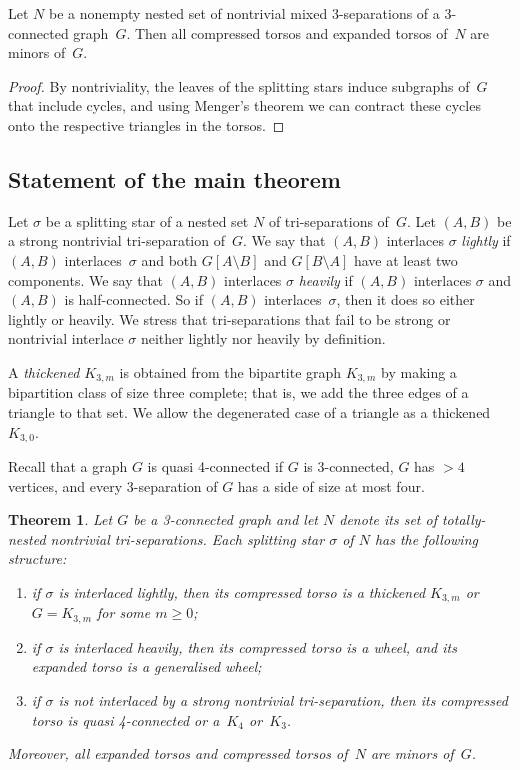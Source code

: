 \documentclass{aic}
\theoremstyle{plain}
\newtheorem{thm}{Theorem}[section]
\theoremstyle{definition}
\theoremstyle{plain}
\theoremstyle{plain}
\newcommand{\sm}{\setminus}
\renewcommand{\geq}{\geqslant}
\begin{document}
\begin{lem}\label{torsoMinors}
Let $N$ be a nonempty nested set of nontrivial mixed 3-separations of a 3-connected graph~$G$.
Then all compressed torsos and expanded torsos of~$N$ are minors of~$G$.
\end{lem}
\begin{proof}
By nontriviality, the leaves of the splitting stars induce subgraphs of~$G$ that include cycles, and using Menger's theorem we can contract these cycles onto the respective triangles in the torsos.
\end{proof}










\subsection{Statement of the main theorem}
Let $\sigma$ be a splitting star of a nested set $N$ of tri-separations of~$G$.
Let $(A,B)$ be a strong nontrivial tri-separation of~$G$.
We say that $(A,B)$ interlaces $\sigma$ \emph{lightly} if $(A,B)$ interlaces~$\sigma$ and both $G[A\sm B]$ and $G[B\sm A]$ have at least two components.
We say that $(A,B)$ interlaces $\sigma$ \emph{heavily} if $(A,B)$ interlaces $\sigma$ and $(A,B)$ is half-connected.
So if $(A,B)$ interlaces~$\sigma$, then it does so either lightly or heavily.
We stress that  tri-separations that fail to be strong or nontrivial interlace $\sigma$ neither lightly nor heavily by definition.

A \emph{thickened $K_{3,m}$} is obtained from the bipartite graph $K_{3,m}$ by making a bipartition class of size three complete; that is, we add the three edges of a triangle to that set. We allow the degenerated case of a triangle as a thickened $K_{3,0}$.

Recall that a graph $G$ is quasi 4-connected if $G$ is 3-connected, $G$ has $>4$ vertices, and every 3-separation of $G$ has a side of size at most four.

\begin{thm}\label{univ_3sepr}
Let $G$ be a 3-connected graph and let $N$ denote its set of totally-nested nontrivial tri-separations.
Each splitting star $\sigma$ of $N$ has the following structure:
\begin{enumerate}[label={\textnormal{(\roman*)}}]
    \item\label{K3Case} if $\sigma$ is interlaced lightly, then its compressed torso is a thickened $K_{3,m}$ or $G=K_{3,m}$ for some $m\geq 0$;
    \item\label{genWheelCase} if $\sigma$ is interlaced heavily, then its compressed torso is a wheel, and its expanded torso is a generalised wheel;
    \item\label{4tangleCase} if $\sigma$ is not interlaced by a strong nontrivial tri-separation, then its compressed torso is quasi 4-connected or a~$K_4$ or~$K_3$.
\end{enumerate}
Moreover, all expanded torsos and compressed torsos of~$N$ are minors of~$G$.
\end{thm}
\end{document}
